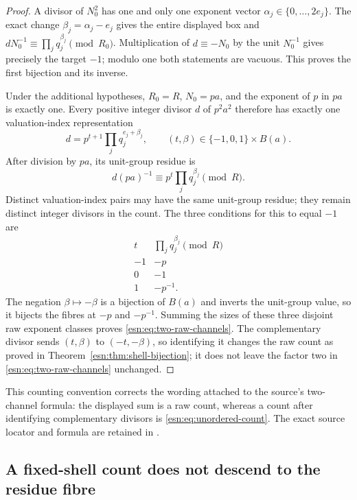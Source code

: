 \begin{proof}
A divisor of \(N_0^2\) has one and only one exponent vector
\(\alpha_j\in\{0,\ldots,2e_j\}\).  The exact change
\(\beta_j=\alpha_j-e_j\) gives the entire displayed box and
\(dN_0^{-1}\equiv\prod_jq_j^{\beta_j}\pmod {R_0}\).
Multiplication of \(d\equiv-N_0\) by the unit \(N_0^{-1}\)
gives precisely the target \(-1\); modulo one both statements are
vacuous.  This proves the first bijection and its inverse.

Under the additional hypotheses, \(R_0=R\), \(N_0=pa\), and
the exponent of \(p\) in \(pa\) is exactly one.  Every positive integer
divisor \(d\) of \(p^2a^2\) therefore has exactly one valuation-index
representation
\[
 d=p^{t+1}\prod_jq_j^{e_j+\beta_j},\qquad
 (t,\beta)\in\{-1,0,1\}\times B(a).
\]
After division by \(pa\), its unit-group residue is
\[
 d(pa)^{-1}\equiv p^t\prod_jq_j^{\beta_j}\pmod R.
\]
Distinct valuation-index pairs may have the same unit-group residue;
they remain distinct integer divisors in the count.
The three conditions for this to equal \(-1\) are
\[
\begin{array}{c|c}
 t&\prod_jq_j^{\beta_j}\pmod R\\\hline
 -1&-p\\0&-1\\1&-p^{-1}.
\end{array}
\]
The negation \(\beta\mapsto-\beta\) is a bijection of \(B(a)\)
and inverts the unit-group value, so it bijects the fibres at
\(-p\) and \(-p^{-1}\).  Summing the sizes of these three disjoint
raw exponent classes proves \eqref{esn:eq:two-raw-channels}.  The
complementary divisor sends \((t,\beta)\) to \((-t,-\beta)\),
so identifying it changes the raw count as proved in
Theorem~\ref{esn:thm:shell-bijection}; it does not leave the factor
two in \eqref{esn:eq:two-raw-channels} unchanged.
\end{proof}

This counting convention corrects the wording attached to the source's
two-channel formula: the displayed sum is a raw count, whereas a count
after identifying complementary divisors is \eqref{esn:eq:unordered-count}.
The exact source locator and formula are retained in
\cite{esn:Residual2026,esn:Provenance}.

\subsection{A fixed-shell count does not descend to the residue fibre}
\label{esn:subsec:non-descent}

